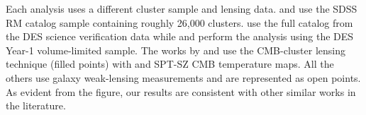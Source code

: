 Each analysis uses a different cluster sample and lensing data.
\citet{simet18} and \citet{geach17} use the SDSS RM catalog sample containing roughly 26,000 clusters. %
\citet{melchoir17} use the full catalog from the DES science verification data while \cite{baxter18} and \cite{mcclintock18} perform the analysis using the DES Year-1 volume-limited sample.
The works by \citet{geach17} and \cite{baxter18} use the CMB-cluster lensing technique (filled points) with \planck{} and {\sc SPT-SZ} CMB temperature maps.
All the others use galaxy weak-lensing measurements and are represented as open points. As evident from the figure, our results are consistent with other similar works in the literature.

